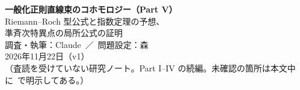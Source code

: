 

\sloppy
\begin{center}
{\LARGE\bfseries\sffamily 一般化正則直線束のコホモロジー（Part V）}\\[8pt]
{\large Riemann--Roch 型公式と指数定理の予想、\\準斉次特異点の局所公式の証明}\\[12pt]
{\large 調査・執筆：Claude\ ／\ 問題設定：森}\\[3pt]
2026年11月22日（v1）\\[3pt]
{\small （査読を受けていない研究ノート。Part I--IV の続編。未確認の箇所は本文中に\tQ\ で明示してある。）}
\end{center}
\begin{abstract}\noindent
(1) 対数 de Rham 複体の Euler 標数が $L$ に依らず $\chi(U)$ に等しいこと（定理 K1）、(2) $U$ がアフィンで $n$ が偶数のとき Poincar\'e 多項式が $\chi(X)$ と $h^k(U;L_U)$ で書けること（定理 K）、(3) 次元の 3 つの振る舞い（正則型の多項式、対数シンプレクティック型の周期的な跳び、全 Euler 標数の不変性）の対比、(4) 準斉次な孤立特異点をもつ平面曲線の茎の公式の $s\ne1$ での証明、(5) 指数定理の予想の正確な定式化と未証明部分、(6) 当初の目標に対する Part I--V の状態表。指数予想は証明されていない。
\end{abstract}



